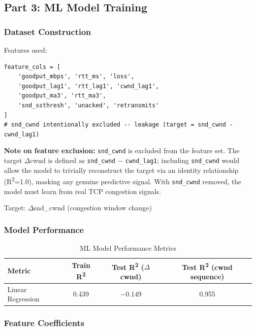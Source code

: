 \documentclass[11pt]{article}
\begin{document}
\subsection{Part 3: ML Model Training}

\subsubsection{Dataset Construction}

Features used:
\begin{lstlisting}
feature_cols = [
    'goodput_mbps', 'rtt_ms', 'loss',
    'goodput_lag1', 'rtt_lag1', 'cwnd_lag1',
    'goodput_ma3', 'rtt_ma3',
    'snd_ssthresh', 'unacked', 'retransmits'
]
# snd_cwnd intentionally excluded -- leakage (target = snd_cwnd - cwnd_lag1)
\end{lstlisting}

\textbf{Note on feature exclusion:} \texttt{snd\_cwnd} is excluded from the feature set. The target $\Delta$cwnd is defined as \texttt{snd\_cwnd} $-$ \texttt{cwnd\_lag1}; including \texttt{snd\_cwnd} would allow the model to trivially reconstruct the target via an identity relationship (R\textsuperscript{2}=1.0), masking any genuine predictive signal. With \texttt{snd\_cwnd} removed, the model must learn from real TCP congestion signals.

Target: $\Delta$snd\_cwnd (congestion window change)

\subsubsection{Model Performance}

\begin{table}[H]
    \centering
    \caption{ML Model Performance Metrics}
    \label{tab:ml_metrics}
    \begin{tabular}{@{}lccc@{}}
        \toprule
        Metric & Train R\textsuperscript{2} & Test R\textsuperscript{2} ($\Delta$cwnd) & Test R\textsuperscript{2} (cwnd sequence) \\
        \midrule
        Linear Regression & 0.439 & $-0.149$ & 0.955 \\
        \bottomrule
    \end{tabular}
\end{table}

\subsubsection{Feature Coefficients}
\end{document}
